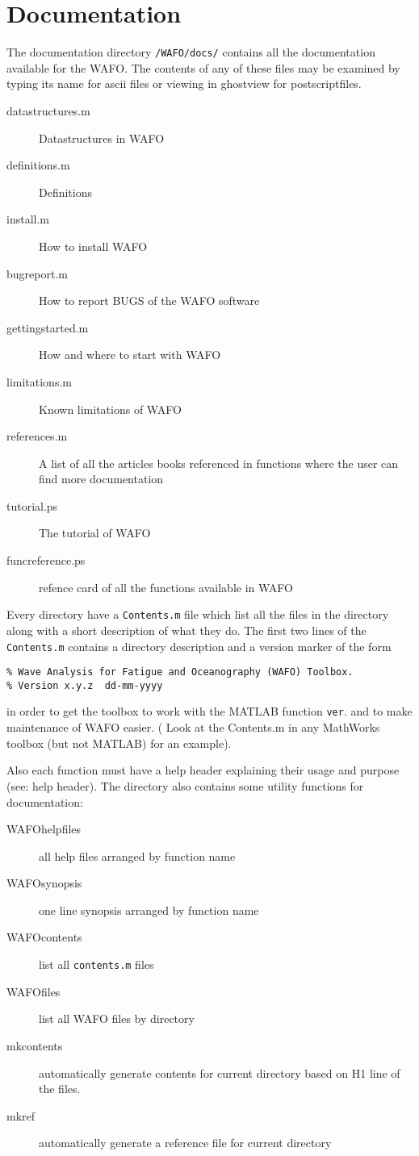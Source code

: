\documentclass[10pt,a4paper]{article}   %
\begin{document}
\section{Documentation}
The documentation directory \verb+/WAFO/docs/+ contains all the documentation available for the WAFO. 
The contents of any of these files
may be examined by typing its name for ascii files or viewing in ghostview for postscriptfiles.
\begin{description}
\item[datastructures.m] Datastructures in WAFO 
\item[definitions.m] Definitions 
\item[install.m] How to install WAFO
\item[bugreport.m] How to report BUGS of the WAFO software
\item[gettingstarted.m] How and where to start with WAFO
\item[limitations.m] Known limitations of WAFO
\item[references.m] A list of all the articles books referenced in functions where the user can find more documentation
\item[tutorial.ps]  The tutorial of WAFO
\item[funcreference.ps] refence card of all the functions available in WAFO
\end{description}
Every directory  have a \verb+Contents.m+ file which list all the files in the 
directory along with a short description of what they do.   The first two lines of the \verb+Contents.m+
contains a directory description and a version marker of the form 
\begin{verbatim}
% Wave Analysis for Fatigue and Oceanography (WAFO) Toolbox.
% Version x.y.z  dd-mm-yyyy
\end{verbatim}
in order to get the toolbox to work with the MATLAB function \verb+ver+.
and to make maintenance of WAFO easier.
( Look at the Contents.m in any MathWorks toolbox (but
 not MATLAB) for an example).

Also each function must have a help header explaining their usage and purpose (see: help header).
The directory also contains some utility functions for documentation:
\begin{description}
\item[WAFOhelpfiles] all help files arranged by function name
\item[WAFOsynopsis] one line synopsis arranged by function name
\item[WAFOcontents] list all \verb+contents.m+ files
\item[WAFOfiles] list all WAFO files by directory
\item[mkcontents] automatically generate contents  for current directory
  based on H1 line of the files.
\item[mkref] automatically generate a reference file  for current directory
\end{description}
\end{document}
